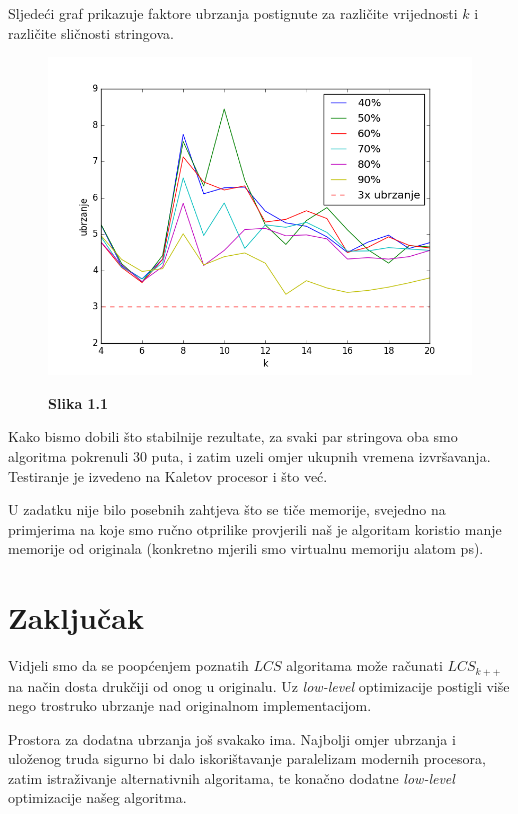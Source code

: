 \documentclass[times, utf8, seminar, numeric]{fer}
\begin{document}
Sljedeći graf prikazuje faktore ubrzanja postignute za različite
vrijednosti $k$ i različite sličnosti stringova. 

\begin{figure}
  \begin{center}
    \includegraphics{../../test/speedplot.png}
  \end{center}
  \centering
  \textbf{Slika 1.1}  
\end{figure}

Kako bismo dobili što stabilnije rezultate, za svaki par stringova
oba smo algoritma pokrenuli $30$ puta, i zatim uzeli omjer ukupnih
vremena izvršavanja. Testiranje je izvedeno na {Kaletov procesor i
  što već}.

U zadatku nije bilo posebnih zahtjeva što se tiče memorije, svejedno
na primjerima na koje smo ručno otprilike provjerili naš je
algoritam koristio manje memorije od originala (konkretno mjerili
smo virtualnu memoriju alatom ps).


\chapter{Zaključak}
Vidjeli smo da se poopćenjem poznatih $LCS$ algoritama može 
računati $LCS_{k++}$ na način dosta drukčiji od onog u originalu.
Uz \emph{low-level} optimizacije postigli više nego trostruko ubrzanje
nad originalnom implementacijom.

Prostora za dodatna ubrzanja još svakako ima. Najbolji omjer ubrzanja
i uloženog truda sigurno bi dalo iskorištavanje paralelizam modernih
procesora, zatim istraživanje alternativnih algoritama, te konačno
dodatne \emph{low-level} optimizacije našeg algoritma.



\end{document}

